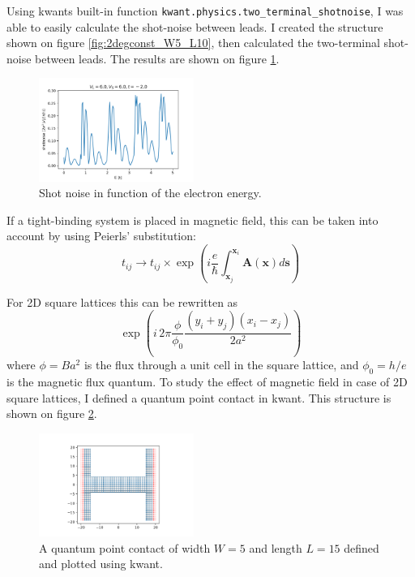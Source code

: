 \documentclass[11pt, a4paper, twocolumn]{article}
\begin{document}
Using kwants built-in function \texttt{kwant.physics.two\_terminal\_shotnoise},
I was able to easily calculate the shot-noise \cite{shotnoise} between leads. 
I created the structure shown on figure \ref{fig:2degconst_W5_L10}, then calculated
the two-terminal shot-noise between leads. The results are shown on figure \ref{fig:shotnoise_2deg_W5_L10_VL6_0_VS6_0}.
\begin{figure}[H]
  \begin{center}
  \includegraphics[width=0.45\textwidth]{./media/shotnoise_2deg_W5_L10_VL6_0_VS6_0.png}
  \caption{Shot noise in function of the electron energy.}
  \label{fig:shotnoise_2deg_W5_L10_VL6_0_VS6_0}
  \end{center}
\end{figure}
If a tight-binding system is placed in magnetic field, this can be taken into account by using Peierls' substitution:
\begin{equation*}
  t_{ij} \rightarrow t_{ij} \times \exp\left(i \frac{e}{\hbar} \int_{\mathbf{x}_j}^{\mathbf{x}_i} \mathbf{A}(\mathbf{x}) d\mathbf{s}\right)
\end{equation*}

For 2D square lattices this can be rewritten as 
\begin{equation*}
  \exp\left(i\, 2 \pi \frac{\phi}{\phi_0} \frac{(y_i + y_j)(x_i-x_j)}{2a^2} \right)  
\end{equation*}
where $\phi = B a^2$ is the flux through a unit cell in the square lattice,
and $\phi_0 = h/e$ is the magnetic flux quantum. To study the effect of magnetic field in case of 
2D square lattices, I defined a quantum point contact in kwant. This structure is shown on figure
\ref{fig:qpc_L15_W5}.

\begin{figure}[H]
  \begin{center}
  \includegraphics[width=0.45\textwidth]{./media/qpc_L15_W5.png}
  \caption{A quantum point contact of width $W=5$ and length $L=15$ defined and plotted using kwant.}
  \label{fig:qpc_L15_W5}
  \end{center}
\end{figure}
\end{document}
